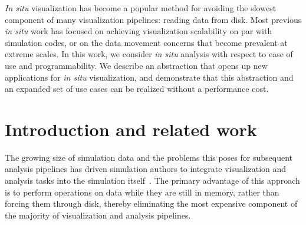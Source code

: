 \newcommand{\freeprocessing}[0]{\textit{Free}processing}
\newcommand{\freeprocessor}[0]{\textit{free}processor}
\newcommand{\nullset}[0]{$\varnothing$}
\newcommand{\insitu}[0]{\textit{in situ}}
\newcommand{\acknowledgements}[1]{#1}


\textit{In situ} visualization has become a popular method for avoiding
the slowest component of many visualization pipelines: reading data
from disk.  Most previous \insitu{} work has focused on achieving
visualization scalability on par with simulation codes, or on the data
movement concerns that become prevalent at extreme scales.
In this work, we consider \insitu{} analysis with respect to ease of
use and programmability.  We describe an abstraction that
opens up new applications for \insitu{} visualization, and demonstrate
that this abstraction and an expanded set of use cases can be realized
without a performance cost.

\section{Introduction and related work}


The growing size of simulation data and the problems this poses
for subsequent analysis pipelines has driven simulation authors to
integrate visualization and analysis tasks into the simulation
itself~\cite{Childs:2013:ChallengesVis}.  The primary advantage of
this approach is to perform operations on data while they are still in
memory, rather than forcing them through disk, thereby eliminating the
most expensive component of the majority of visualization and analysis
pipelines.

